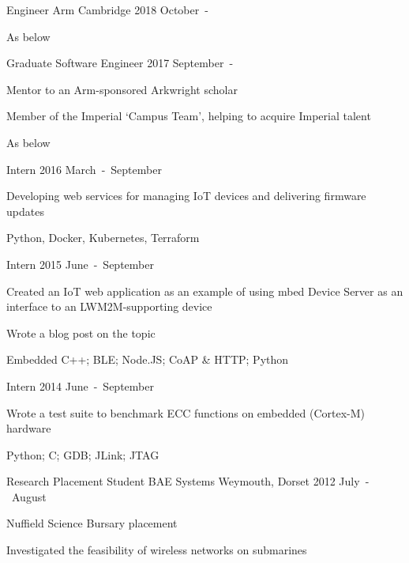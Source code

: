 \begin{cventries}

\cventry
  {Engineer}
  {Arm}
  {Cambridge}
  {2018 October~-}
  {\begin{cvitems}
    \item {As below}
  \end{cvitems}}

\cventryprevrole
  {Graduate Software Engineer}
  {2017 September~-}
  {\begin{cvitems}
    \item {Mentor to an Arm-sponsored Arkwright scholar}
    \item {Member of the Imperial `Campus Team', helping to acquire Imperial talent}
    \item {As below}
  \end{cvitems}}

\cventryprevrole
  {Intern}
  {2016 March~-~September}
  {\begin{cvitems}
    \item {Developing web services for managing IoT devices and delivering firmware updates}
    \item {Python, Docker, Kubernetes, Terraform}
  \end{cvitems}}

\cventryprevrole
  {Intern}
  {2015 June~-~September}
  {\begin{cvitems}
    \item {Created an IoT web application as an example of using mbed Device Server as an interface to an LWM2M-supporting device}
    \item {Wrote a blog post on the topic}
    \item {Embedded C++; BLE; Node.JS; CoAP \& HTTP; Python}
  \end{cvitems}}

\cventryprevrole
  {Intern}
  {2014 June~-~September}
  {\begin{cvitems}
    \item {Wrote a test suite to benchmark ECC functions on embedded (Cortex-M) hardware}
    \item {Python; C; GDB; JLink; JTAG}
  \end{cvitems}}

\cventry
  {Research Placement Student}
  {BAE Systems}
  {Weymouth, Dorset}
  {2012 July~-~August}
  {\begin{cvitems}
    \item {Nuffield Science Bursary placement}
    \item {Investigated the feasibility of wireless networks on submarines}
  \end{cvitems}}

\end{cventries}
